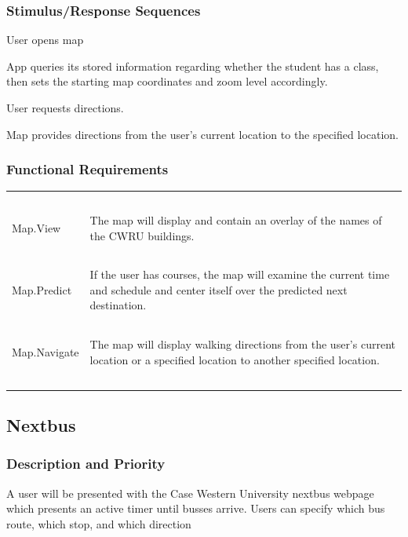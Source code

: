 \documentclass[pdftex,12pt,letter]{article}
\begin{document}
\subsubsection{Stimulus/Response Sequences}
\begin{description}\itemsep1pt
\item[Stimulus:] User opens map
\item[Response:] App queries its stored information regarding whether the student has a class, then sets the starting map coordinates and zoom level accordingly.\\
\item[Stimulus:] User requests directions.\\
\item[Response:] Map provides directions from the user's current location to the specified location.\\
\end{description}
\subsubsection{Functional Requirements}
\begin{table}[!h]
\begin{tabularx}{\textwidth }[t]{|l Y|}
\hline
~&~\\
Map.View & The map will display and contain an overlay of the names of the CWRU buildings. \\ 
~&~\\
Map.Predict & If the user has courses, the map will examine the current time and schedule and center itself over the predicted next destination. \\
~&~\\
Map.Navigate & The map will display walking directions from the user's current location or a specified location to another specified location. \\
~&~\\
\hline
\end{tabularx}
\end{table}
\subsection{Nextbus}
\subsubsection{Description and Priority}
A user will be presented with the Case Western University nextbus webpage which presents an active timer until busses arrive. Users can specify which bus route, which stop, and which direction 
\end{document}
